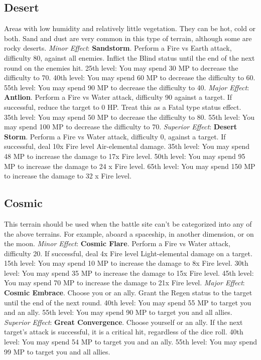\begin{multicols}{2}
\subsection{Desert}
\label{subsec:geo-desert}
Areas with low humidity and relatively little vegetation. They can be hot, cold or both. Sand and dust are very common in this type of terrain, although some are rocky deserts.
\textit{Minor Effect}: \textbf{Sandstorm}. Perform a Fire vs Earth attack, difficulty 80, against all enemies. Inflict the Blind status until the end of the next round on the enemies hit. 25th level: You may spend 30 MP to decrease the difficulty to 70. 40th level: You may spend 60 MP to decrease the difficulty to 60. 55th level: You may spend 90 MP to decrease the difficulty to 40.
\textit{Major Effect}: \textbf{Antlion}. Perform a Fire vs Water attack, difficulty 90 against a target. If successful, reduce the target to 0 HP. Treat this as a Fatal type status effect. 35th level: You may spend 50 MP to decrease the difficulty to 80. 55th level: You may spend 100 MP to decrease the difficulty to 70.
\textit{Superior Effect}: \textbf{Desert Storm}. Perform a Fire vs Water attack, difficulty 0, against a target. If successful, deal 10x Fire level Air-elemental damage. 35th level: You may spend 48 MP to increase the damage to 17x Fire level. 50th level: You may spend 95 MP to increase the damage to 24 x Fire level. 65th level: You may spend 150 MP to increase the damage to 32 x Fire level.

\subsection{Cosmic}
\label{subsec:geo-cosmic}
This terrain should be used when the battle site can’t be categorized into any of the above terrains. For example, aboard a spaceship, in another dimension, or on the moon.
\textit{Minor Effect}: \textbf{Cosmic Flare}. Perform a Fire vs Water attack, difficulty 20. If successful, deal 4x Fire level Light-elemental damage on a target. 15th level: You may spend 10 MP to increase the damage to 8x Fire level. 30th level: You may spend 35 MP to increase the damage to 15x Fire level. 45th level: You may spend 70 MP to increase the damage to 21x Fire level.
\textit{Major Effect}: \textbf{Cosmic Embrace}. Choose you or an ally. Grant the Regen status to the target until the end of the next round. 40th level: You may spend 55 MP to target you and an ally. 55th level: You may spend 90 MP to target you and all allies.
\textit{Superior Effect}: \textbf{Great Convergence}. Choose yourself or an ally. If the next target’s attack is successful, it is a critical hit, regardless of the dice roll. 40th level: You may spend 54 MP to target you and an ally. 55th level: You may spend 99 MP to target you and all allies.

\end{multicols}
 
